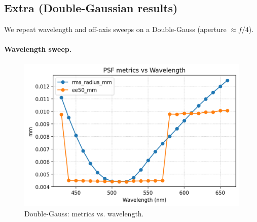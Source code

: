 \documentclass[11pt,a4paper]{article}
\begin{document}
	\subsection*{Extra (Double-Gaussian results)}\label{extra-double-gaussian}
	
	We repeat wavelength and off-axis sweeps on a Double-Gauss (aperture \(\approx f/4\)).
	
	\paragraph{Wavelength sweep.}%
	\begin{figure}[H]
		\centering
		\includegraphics[width=\linewidth]{sweep_lambda/metrics_vs_lambda_nm.png}
		\caption{Double-Gauss: metrics vs. wavelength.}
	\end{figure}
	
\end{document}

